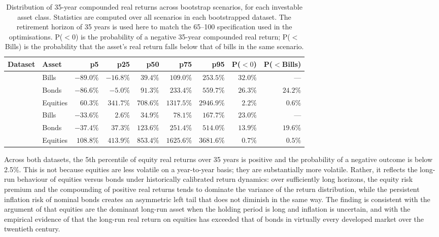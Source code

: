 \documentclass[11pt]{article}
\begin{document}
\begin{table}[h!]
  \centering
  \caption{Distribution of 35-year compounded real returns across bootstrap scenarios, for each investable asset class. Statistics are computed over all scenarios in each bootstrapped dataset. The retirement horizon of 35 years is used here to match the 65--100 specification used in the optimisations. P($<0$) is the probability of a negative 35-year compounded real return; P($<$Bills) is the probability that the asset's real return falls below that of bills in the same scenario.}
  \label{tab:bond_scenario_outcomes}
  \begin{tabular}{llrrrrrrr}
    \toprule
    Dataset & Asset & p5 & p25 & p50 & p75 & p95 & P($<0$) & P($<$Bills) \\
    \midrule
      & Bills     & $-89.0\%$ & $-16.8\%$ & $39.4\%$  & $109.0\%$ & $253.5\%$ & $32.0\%$ & --- \\
      & Bonds     & $-86.6\%$ & $-5.0\%$  & $91.3\%$  & $233.4\%$ & $559.7\%$ & $26.3\%$ & $24.2\%$ \\
      & Equities  & $60.3\%$  & $341.7\%$ & $708.6\%$ & $1317.5\%$& $2946.9\%$& $2.2\%$  & $0.6\%$  \\
    \midrule
      & Bills     & $-33.6\%$ & $2.6\%$   & $34.9\%$  & $78.1\%$  & $167.7\%$ & $23.0\%$ & --- \\
      & Bonds     & $-37.4\%$ & $37.3\%$  & $123.6\%$ & $251.4\%$ & $514.0\%$ & $13.9\%$ & $19.6\%$ \\
      & Equities  & $108.8\%$ & $413.9\%$ & $853.4\%$ & $1625.6\%$& $3681.6\%$& $0.7\%$  & $0.5\%$  \\
    \bottomrule
  \end{tabular}
\end{table}

Across both datasets, the 5th percentile of equity real returns over 35 years is positive and the probability of a negative outcome is below 2.5\%. This is not because equities are less volatile on a year-to-year basis; they are substantially more volatile. Rather, it reflects the long-run behaviour of equities versus bonds under historically calibrated return dynamics: over sufficiently long horizons, the equity risk premium and the compounding of positive real returns tends to dominate the variance of the return distribution, while the persistent inflation risk of nominal bonds creates an asymmetric left tail that does not diminish in the same way. The finding is consistent with the argument of \textcite{siegel1994stocks} that equities are the dominant long-run asset when the holding period is long and inflation is uncertain, and with the empirical evidence of \textcite{dimson2002triumph} that the long-run real return on equities has exceeded that of bonds in virtually every developed market over the twentieth century.
\end{document}
